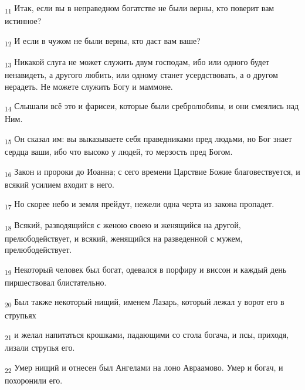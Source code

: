 \begin{tcolorbox}
\textsubscript{11} Итак, если вы в неправедном богатстве не были верны, кто поверит вам истинное?
\end{tcolorbox}
\begin{tcolorbox}
\textsubscript{12} И если в чужом не были верны, кто даст вам ваше?
\end{tcolorbox}
\begin{tcolorbox}
\textsubscript{13} Никакой слуга не может служить двум господам, ибо или одного будет ненавидеть, а другого любить, или одному станет усердствовать, а о другом нерадеть. Не можете служить Богу и маммоне.
\end{tcolorbox}
\begin{tcolorbox}
\textsubscript{14} Слышали всё это и фарисеи, которые были сребролюбивы, и они смеялись над Ним.
\end{tcolorbox}
\begin{tcolorbox}
\textsubscript{15} Он сказал им: вы выказываете себя праведниками пред людьми, но Бог знает сердца ваши, ибо что высоко у людей, то мерзость пред Богом.
\end{tcolorbox}
\begin{tcolorbox}
\textsubscript{16} Закон и пророки до Иоанна; с сего времени Царствие Божие благовествуется, и всякий усилием входит в него.
\end{tcolorbox}
\begin{tcolorbox}
\textsubscript{17} Но скорее небо и земля прейдут, нежели одна черта из закона пропадет.
\end{tcolorbox}
\begin{tcolorbox}
\textsubscript{18} Всякий, разводящийся с женою своею и женящийся на другой, прелюбодействует, и всякий, женящийся на разведенной с мужем, прелюбодействует.
\end{tcolorbox}
\begin{tcolorbox}
\textsubscript{19} Некоторый человек был богат, одевался в порфиру и виссон и каждый день пиршествовал блистательно.
\end{tcolorbox}
\begin{tcolorbox}
\textsubscript{20} Был также некоторый нищий, именем Лазарь, который лежал у ворот его в струпьях
\end{tcolorbox}
\begin{tcolorbox}
\textsubscript{21} и желал напитаться крошками, падающими со стола богача, и псы, приходя, лизали струпья его.
\end{tcolorbox}
\begin{tcolorbox}
\textsubscript{22} Умер нищий и отнесен был Ангелами на лоно Авраамово. Умер и богач, и похоронили его.
\end{tcolorbox}
